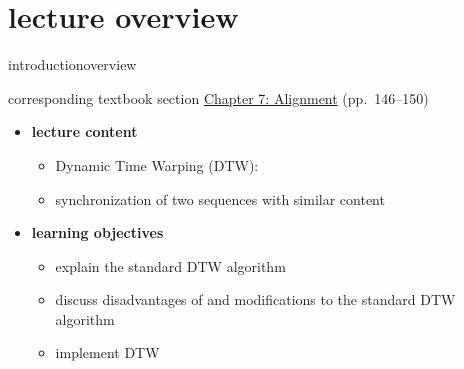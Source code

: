 




\subtitle{Module 7.1: Audio-to-Audio \& Audio-to-Score Alignment}


	

    \section[overview]{lecture overview}
        \begin{frame}{introduction}{overview}
            \begin{block}{corresponding textbook section}
                    \href{http://ieeexplore.ieee.org/xpl/articleDetails.jsp?arnumber=6331124}{Chapter 7: Alignment} (pp.~146--150)
            \end{block}

            \begin{itemize}
                \item   \textbf{lecture content}
                    \begin{itemize}
                        \item   Dynamic Time Warping (DTW):
                        \item[] synchronization of two sequences with similar content
                    \end{itemize}
                \bigskip
                \item<2->   \textbf{learning objectives}
                    \begin{itemize}
                        \item   explain the standard DTW algorithm
                        \item   discuss disadvantages of and modifications to the standard DTW algorithm
                        \item   implement DTW
                    \end{itemize}
            \end{itemize}
        \end{frame}

